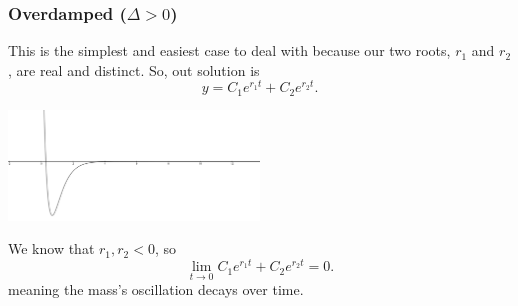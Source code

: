 \subsubsection{Overdamped ($\Delta > 0$)}
This is the simplest and easiest case to deal with because our two roots, $r_1$ and $r_2$, are real and distinct. So, out solution is
\begin{equation*}
	y = C_1e^{r_1 t} + C_2e^{r_2 t}.
\end{equation*}
\begin{center}
	\includegraphics[width=0.5\textwidth]{./higherOrder/freeVibrs/overdamped.png}
\end{center}
We know that $r_1, r_2 < 0$, so
\begin{equation*}
	\lim\limits_{t \to 0}{C_1e^{r_1 t} + C_2e^{r_2 t}} = 0.
\end{equation*}
meaning the mass's oscillation decays over time.
